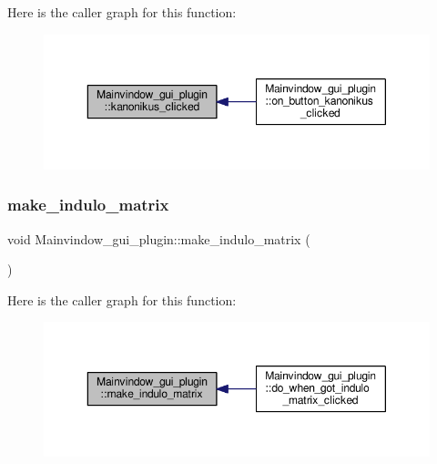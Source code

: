 Here is the caller graph for this function\+:\nopagebreak
\begin{figure}[H]
\begin{center}
\leavevmode
\includegraphics[width=350pt]{classMainvindow__gui__plugin_aacc5de871594914c5d4c8edcec6576a8_icgraph}
\end{center}
\end{figure}
\mbox{\label{classMainvindow__gui__plugin_ae1b472871fd6e98296a968a1f6dee653}} 
\subsubsection{\texorpdfstring{make\+\_\+indulo\+\_\+matrix}{make\_indulo\_matrix}}
{\footnotesize\ttfamily void Mainvindow\+\_\+gui\+\_\+plugin\+::make\+\_\+indulo\+\_\+matrix (\begin{DoxyParamCaption}{ }\end{DoxyParamCaption})\hspace{0.3cm}{\ttfamily [signal]}}

Here is the caller graph for this function\+:\nopagebreak
\begin{figure}[H]
\begin{center}
\leavevmode
\includegraphics[width=350pt]{classMainvindow__gui__plugin_ae1b472871fd6e98296a968a1f6dee653_icgraph}
\end{center}
\end{figure}
\mbox{\label{classMainvindow__gui__plugin_ab72edb0176103371d01ede7a001746a4}} 

